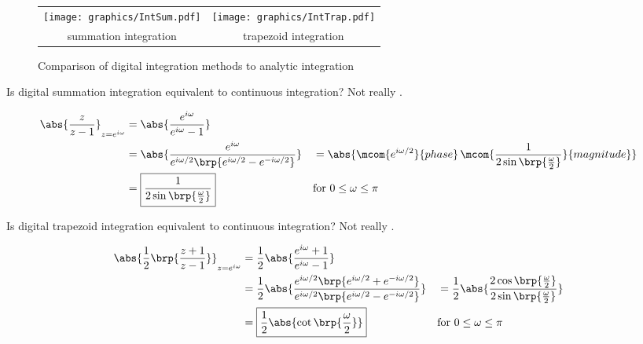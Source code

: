  
\begin{figure}[h]
  \centering
  \begin{tabular}{|c|c|}
    \hline
    \texttt{[image: graphics/IntSum.pdf]}&\texttt{[image: graphics/IntTrap.pdf]}
  \\summation integration & trapezoid integration
  \\\hline
  \end{tabular}
  \caption{Comparison of digital integration methods to analytic integration\label{fig:dspint}}
\end{figure}
Is digital summation integration equivalent to continuous integration?
Not really .

\begin{align*}
  \abs{\frac{z}{z-1}}_{z=e^{i\omega}}
    &= \abs{\frac{e^{i\omega}}{e^{i\omega}-1}}
  \\&= \abs{\frac{e^{i\omega}}{e^{i\omega/2}\brp{e^{i\omega/2}-e^{-i\omega/2}}}}
   &&= \abs{\mcom{e^{i\omega/2}}{phase}\,\mcom{\frac{1}{2\sin\brp{\frac{\omega}{2}}}}{magnitude}}
  \\&= \boxed{\frac{1}{2\sin\brp{\frac{\omega}{2}}}} 
    && \text{for $0\le\omega\le\pi$}
\end{align*}


Is digital trapezoid integration equivalent to continuous integration? 
Not really .
 
\begin{align*}
  \abs{\frac{1}{2}\brp{\frac{z+1}{z-1}}}_{z=e^{i\omega}}
    &= \frac{1}{2}
       \abs{\frac{e^{i\omega}+1}{e^{i\omega}-1}}
  \\&= \frac{1}{2}
       \abs{\frac{e^{i\omega/2}\brp{e^{i\omega/2}+e^{-i\omega/2}}}
                 {e^{i\omega/2}\brp{e^{i\omega/2}-e^{-i\omega/2}}}
           }
   &&= \frac{1}{2}
       \abs{\frac{2\cos\brp{\frac{\omega}{2}}}
                 {2\sin\brp{\frac{\omega}{2}}}
           }
  \\&= \boxed{\frac{1}{2} \abs{\cot\brp{\frac{\omega}{2}}}}
    && \text{for $0\le\omega\le\pi$}
\end{align*}





